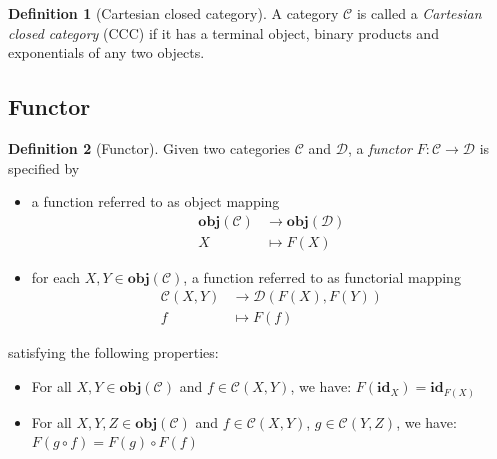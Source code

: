 \documentclass[12pt,a4paper]{report}
\theoremstyle{definition}
\newtheorem{definition}{Definition}[chapter]
\begin{document}
        \begin{definition}[Cartesian closed category]
            A category $\mathcal{C}$ is called a \emph{Cartesian closed category} (CCC) if it has a terminal object, binary products and exponentials of any two objects.
        \end{definition}

        
        \subsection{Functor}
        \begin{definition}[Functor] \label{def: functor}
            Given two categories $\mathcal{C}$ and $\mathcal{D}$, a \emph{functor} $F: \mathcal{C} \to \mathcal{D}$ is specified by
            \begin{itemize}
                \item 
                    a function referred to as object mapping
                    \[\begin{aligned}
                        \textbf{obj}(\mathcal{C}) &\to \textbf{obj}(\mathcal{D}) \\
                        X &\mapsto F(X)
                    \end{aligned}\]

                \item 
                    for each $X, Y \in \textbf{obj}(\mathcal{C})$, a function referred to as functorial mapping
                    \[\begin{aligned}
                        \mathcal{C}{(X,Y)} &\to \mathcal{D}{(F(X),F(Y))} \\
                        f &\mapsto F(f)
                    \end{aligned}\]
            \end{itemize}
            satisfying the following properties:
            \begin{itemize}
                \item 
                    For all $X, Y \in \textbf{obj}(\mathcal{C})$ and $f \in \mathcal{C}{(X,Y)}$, we have: $ F(\textbf{id}_X) = \textbf{id}_{F(X)}$
                \item
                    For all $X, Y, Z \in \textbf{obj}(\mathcal{C})$ and $f \in \mathcal{C}{(X,Y)}$, $g \in \mathcal{C}{(Y,Z)}$, we have: $F(g \circ f) = F(g) \circ F(f)$
            \end{itemize}
        \end{definition}
\end{document}

